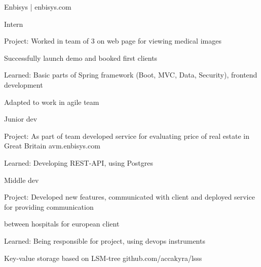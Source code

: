 \documentclass[]{cv-style}
\begin{document}
    {\large{Enbisys | enbisys.com}}
    {\par}
    \vspace{0.2cm}
    {Intern}
    {\par}
    \hspace*{0.7cm} Project: Worked in team of 3 on web page for viewing medical images
    {\par}
    \hspace*{0.7cm} Successfully launch demo and booked first clients
    {\par}
    \hspace*{0.7cm} Learned: Basic parts of Spring framework (Boot, MVC, Data, Security), frontend development
    {\par}
    \hspace*{0.7cm} Adapted to work in agile team
    {\par}
    \vspace{0.1cm}
    {Junior dev}
    {\par}
    \hspace*{0.7cm} Project: As part of team developed service for evaluating price of real estate in Great Britain
    avm.enbisys.com
    {\par}
    \hspace*{0.7cm} Learned: Developing REST-API, using Postgres
    {\par}
    \vspace{0.1cm}
    {Middle dev}
    {\par}
    \hspace*{0.7cm} Project: Developed new features, communicated with client and deployed service for providing communication
    {\par}
    \hspace*{0.7cm} between hospitals for european client
    {\par}
    \hspace*{0.7cm} Learned: Being responsible for project, using devops instruments
    {\par}
    \vspace{0.3cm}

    \vspace{1cm}


    \hspace*{0.7cm} {Key-value storage based on LSM-tree github.com/accakyra/lsss}

    \vspace{1cm}
\end{document}
